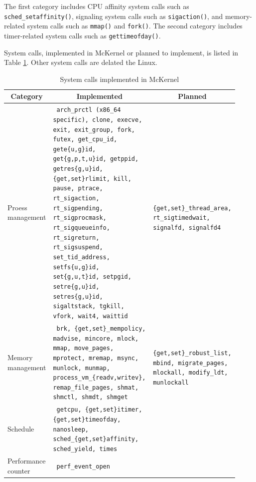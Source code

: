 \documentclass[twoside,11pt,fleqn]{book}
\begin{document}
The first category includes
CPU affinity system calls such as \texttt{sched\_setaffinity()},
signaling system calls such as \texttt{sigaction()},
and memory-related system calls such as \texttt{mmap()} and \texttt{fork()}.
The second category includes timer-related system calls such as
\texttt{gettimeofday()}.

System calls, implemented in McKernel or planned to implement, is
listed in Table \ref{tab:syscalls_implemented}.
Other system calls are delated the Linux.

\begin{table}[!htb]
\centering
\footnotesize
\caption{System calls implemented in McKernel}\vspace{0.0em}
\label{tab:syscalls_implemented}
\begin{tabular}{|p{0.12\linewidth}|p{0.45\linewidth}|p{0.35\linewidth}|} \hline
\multicolumn{1}{|c}{\textbf{Category}}&\multicolumn{1}{|c}{\textbf{Implemented}}&\multicolumn{1}{|c|}{\textbf{Planned}}\\ \hline \hline
Proess management&\texttt{%
arch\_prctl (x86\_64 specific), clone, execve, exit, exit\_group, fork, futex, get\_cpu\_id, gete\{u,g\}id, get\{g,p,t,u\}id, getppid, getres\{g,u\}id, \{get,set\}rlimit, kill, pause, ptrace, rt\_sigaction, rt\_sigpending, rt\_sigprocmask, rt\_sigqueueinfo, rt\_sigreturn, rt\_sigsuspend, set\_tid\_address, setfs\{u,g\}id, set\{g,u,t\}id, setpgid, setre\{g,u\}id, setres\{g,u\}id, sigaltstack, tgkill, vfork, wait4, waittid
}&\texttt{%
\{get,set\}\_thread\_area, rt\_sigtimedwait, signalfd, signalfd4
}\\ \hline
Memory management&\texttt{%
brk, \{get,set\}\_mempolicy, madvise, mincore, mlock, mmap, move\_pages, mprotect, mremap, msync, munlock, munmap, process\_vm\_\{readv,writev\}, remap\_file\_pages, shmat, shmctl, shmdt, shmget
}&\texttt{%
\{get,set\}\_robust\_list, mbind, migrate\_pages, mlockall, modify\_ldt, munlockall
}\\ \hline
Schedule&\texttt{%
getcpu, \{get,set\}itimer, \{get,set\}timeofday, nanosleep, sched\_\{get,set\}affinity, sched\_yield, times
}&\texttt{%
}\\ \hline
Performance counter&\texttt{%
perf\_event\_open
}&\texttt{%
}\\ \hline
\end{tabular}
\vspace{-0em}
\end{table}
\FloatBarrier

\end{document}
